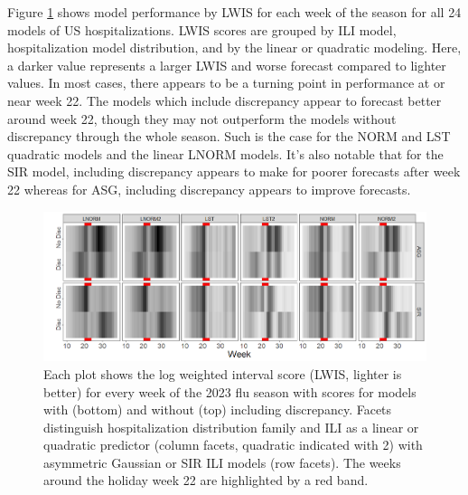 \documentclass[ba]{imsart}
\theoremstyle{plain}
\theoremstyle{definition}
\theoremstyle{remark}
\begin{document}
Figure \ref{fig:us_lwis} shows model performance by LWIS for each week of the season for all 24 models of US hospitalizations. LWIS scores are grouped by ILI model, hospitalization model distribution, and by the linear or quadratic modeling. Here, a darker value represents a larger LWIS and worse forecast compared to lighter values.  In most cases, there appears to be a turning point in performance at or near week 22. The models which include discrepancy appear to forecast better around week 22, though they may not outperform the models without discrepancy through the whole season. 
Such is the case for the NORM and LST quadratic models and the linear LNORM models. It's also notable that for the SIR model, including discrepancy appears to make for poorer forecasts after week 22 whereas for ASG, including discrepancy appears to improve forecasts.



\begin{figure}
    
\includegraphics[scale = .5]{lwis_us_full_season}
\caption{Each plot shows the log weighted interval score (LWIS, lighter is better) for every week of the 2023 flu season with scores for models with (bottom) and without (top) including discrepancy. Facets distinguish hospitalization distribution family and ILI as a linear or quadratic predictor (column facets, quadratic indicated with 2) with asymmetric Gaussian or SIR ILI models (row facets). The weeks around the holiday week 22 are highlighted by a red band.}
    \label{fig:us_lwis}
\end{figure}

 
\end{document}
